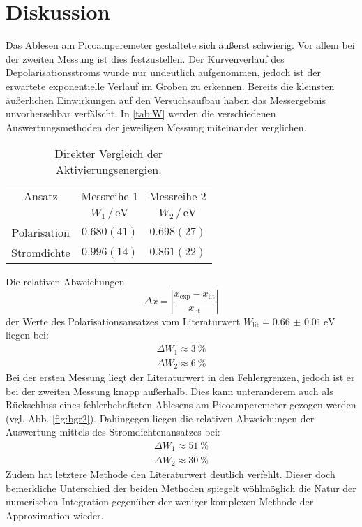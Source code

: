 \section{Diskussion}
\label{sec:Diskussion}
Das Ablesen am Picoamperemeter gestaltete sich äußerst schwierig. Vor allem bei der zweiten Messung ist dies festzustellen.
Der Kurvenverlauf des Depolarisationsstroms wurde nur undeutlich aufgenommen,
jedoch ist der erwartete exponentielle Verlauf im Groben zu erkennen.
Bereits die kleinsten äußerlichen Einwirkungen auf den Versuchsaufbau haben das Messergebnis unvorhersehbar verfälscht.
In \autoref{tab:W} werden die verschiedenen Auswertungsmethoden der jeweiligen Messung miteinander verglichen.
\begin{table}[h]
    \centering
    \caption{Direkter Vergleich der Aktivierungsenergien.}
    \label{tab:W}
    \begin{tabular}{cSS}
        \toprule
        {Ansatz} & {Messreihe 1} & {Messreihe 2}\\
        \cmidrule(lr){2-2}\cmidrule(lr){3-3}
        &{$W_1 \, / \, \si{\electronvolt}$} & {$W_2 \, / \, \si{\electronvolt}$} \\
        \midrule
        {Polarisation} & {$0.680(41)$} & {$0.698(27)$} \\   
        {Stromdichte}  & {$0.996(14)$} & {$0.861(22)$} \\
        \bottomrule
        \end{tabular}
\end{table}

\noindent
Die relativen Abweichungen
\begin{equation}
    \Delta x = \left| \frac{x_\text{exp} - x_\text{lit}}{x_\text{lit}}\right|
\end{equation}
der Werte des Polarisationsansatzes vom Literaturwert $W_\text{lit} = \qty{0.66(1)}{\electronvolt}$\cite{Buch} liegen bei:
\begin{align}
    \Delta W_1 \approx \qty{3}{\percent} \\
    \Delta W_2 \approx \qty{6}{\percent}
\end{align}
Bei der ersten Messung liegt der Literaturwert in den Fehlergrenzen, jedoch ist er bei der zweiten Messung knapp außerhalb.
Dies kann unteranderem auch als Rückschluss eines fehlerbehafteten Ablesens am Picoamperemeter gezogen werden (vgl. Abb. \ref{fig:bgr2}).
Dahingegen liegen die relativen Abweichungen der Auswertung mittels des Stromdichtenansatzes bei:
\begin{align}
    \Delta W_1 \approx \qty{51}{\percent} \\
    \Delta W_2 \approx \qty{30}{\percent}
\end{align}
Zudem hat letztere Methode den Literaturwert deutlich verfehlt.
Dieser doch bemerkliche Unterschied der beiden Methoden spiegelt wöhlmöglich die Natur der numerischen Integration gegenüber der
weniger komplexen Methode der Approximation wieder. 

